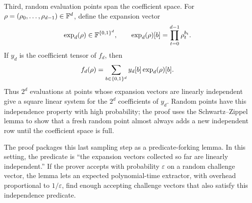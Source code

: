 Third, random evaluation points span the coefficient space.  For
$\rho=(\rho_0,\ldots,\rho_{d-1})\in\mathbb{F}^d$, define the expansion vector
\[
  \operatorname{exp}_d(\rho)\in\mathbb{F}^{\{0,1\}^d},
  \qquad
  \operatorname{exp}_d(\rho)[b]
  =
  \prod_{t=0}^{d-1}\rho_t^{b_t}.
\]
If $y_d$ is the coefficient tensor of $f_d$, then
\[
  f_d(\rho)=\sum_{b\in\{0,1\}^d}y_d[b]\operatorname{exp}_d(\rho)[b].
\]
Thus $2^d$ evaluations at points whose expansion vectors are linearly
independent give a square linear system for the $2^d$ coefficients of $y_d$.
Random points have this independence property with high probability; the proof
uses the Schwartz--Zippel lemma to show that a fresh random point almost always
adds a new independent row until the coefficient space is full.

The proof packages this last sampling step as a predicate-forking lemma.  In
this setting, the predicate is ``the expansion vectors collected so far are
linearly independent.''  If the prover accepts with probability $\varepsilon$ on
a random challenge vector, the lemma lets an expected polynomial-time extractor,
with overhead proportional to $1/\varepsilon$, find enough accepting challenge
vectors that also satisfy this independence predicate.

